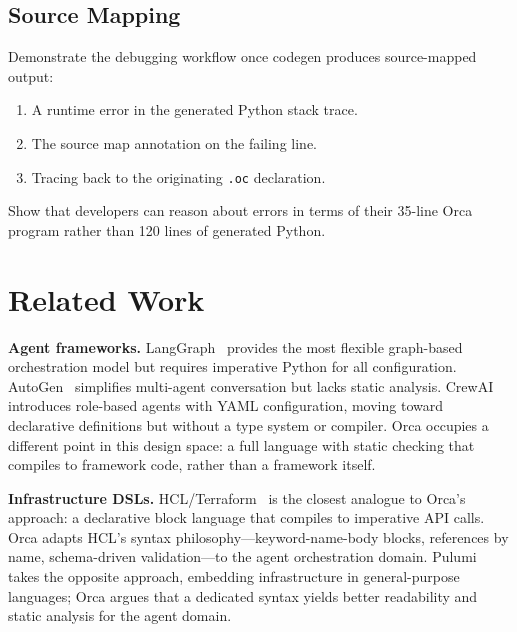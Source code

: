 \documentclass[sigconf,nonacm]{acmart}
\begin{document}
\subsection{Source Mapping}
\label{sec:eval:sourcemap}

\begin{todobox}
Demonstrate the debugging workflow once codegen produces source-mapped
output:
\begin{enumerate}
  \item A runtime error in the generated Python stack trace.
  \item The source map annotation on the failing line.
  \item Tracing back to the originating \texttt{.oc} declaration.
\end{enumerate}
Show that developers can reason about errors in terms of their 35-line
Orca program rather than 120 lines of generated Python.
\end{todobox}

\section{Related Work}
\label{sec:related}

\noindent\textbf{Agent frameworks.}
LangGraph~\cite{langgraph} provides the most flexible graph-based
orchestration model but requires imperative Python for all configuration.
AutoGen~\cite{autogen} simplifies multi-agent conversation but lacks
static analysis. CrewAI~\cite{crewai} introduces role-based agents with
YAML configuration, moving toward declarative definitions but without a
type system or compiler. Orca occupies a different point in this design
space: a full language with static checking that compiles to framework
code, rather than a framework itself.

\noindent\textbf{Infrastructure DSLs.}
HCL/Terraform~\cite{terraform} is the closest analogue to Orca's approach:
a declarative block language that compiles to imperative API calls. Orca
adapts HCL's syntax philosophy---keyword-name-body blocks, references by
name, schema-driven validation---to the agent orchestration domain. Pulumi
takes the opposite approach, embedding infrastructure in general-purpose
languages; Orca argues that a dedicated syntax yields better readability
and static analysis for the agent domain.
\end{document}
